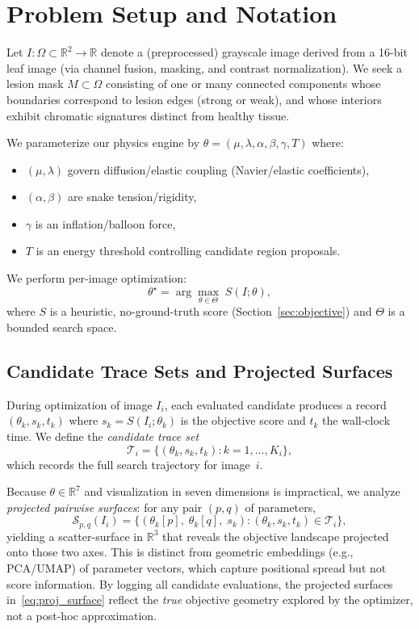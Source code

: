 \documentclass[11pt,a4paper]{article}
\newcommand{\R}{\mathbb{R}}
\begin{document}
\section{Problem Setup and Notation}
Let $I:\Omega\subset\R^2\rightarrow\R$ denote a (preprocessed) grayscale image derived from a 16-bit leaf image (via channel fusion, masking, and contrast normalization). We seek a lesion mask $M\subset\Omega$ consisting of one or many connected components whose boundaries correspond to lesion edges (strong or weak), and whose interiors exhibit chromatic signatures distinct from healthy tissue.

We parameterize our physics engine by $\theta = (\mu,\lambda,\alpha,\beta,\gamma,T)$ where:
\begin{itemize}
    \item $(\mu,\lambda)$ govern diffusion/elastic coupling (Navier/elastic coefficients),
    \item $(\alpha,\beta)$ are snake tension/rigidity,
    \item $\gamma$ is an inflation/balloon force,
    \item $T$ is an energy threshold controlling candidate region proposals.
\end{itemize}
We perform per-image optimization:
\begin{equation}
\theta^\star = \arg\max_{\theta \in \Theta} \; S(I;\theta),
\end{equation}
where $S$ is a heuristic, no-ground-truth score (Section~\ref{sec:objective}) and $\Theta$ is a bounded search space.

\subsection{Candidate Trace Sets and Projected Surfaces}
\label{sec:trace_surfaces}
During optimization of image $I_i$, each evaluated candidate produces a record $({\theta}_k, s_k, t_k)$ where $s_k = S(I_i; {\theta}_k)$ is the objective score and $t_k$ the wall-clock time.
We define the \emph{candidate trace set}
\begin{equation}
\mathcal{T}_i = \bigl\{({\theta}_k, s_k, t_k) : k = 1, \dots, K_i\bigr\},
\label{eq:trace_set}
\end{equation}
which records the full search trajectory for image~$i$.

Because $\theta\in\R^7$ and visualization in seven dimensions is impractical, we analyze \emph{projected pairwise surfaces}: for any pair $(p,q)$ of parameters,
\begin{equation}
\mathcal{S}_{p,q}(I_i) = \bigl\{(\theta_k[p],\; \theta_k[q],\; s_k) : (\theta_k, s_k, t_k) \in \mathcal{T}_i \bigr\},
\label{eq:proj_surface}
\end{equation}
yielding a scatter-surface in $\R^3$ that reveals the objective landscape projected onto those two axes. This is distinct from geometric embeddings (e.g., PCA/UMAP) of parameter vectors, which capture positional spread but not score information. By logging all candidate evaluations, the projected surfaces in~\eqref{eq:proj_surface} reflect the \emph{true} objective geometry explored by the optimizer, not a post-hoc approximation.
\end{document}
